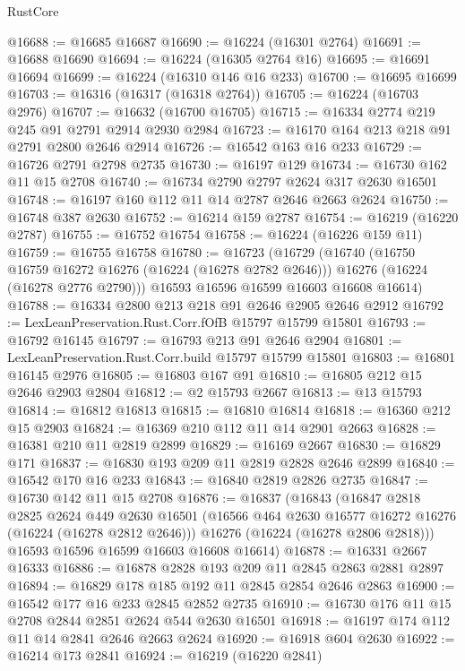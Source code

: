 \begin{lexlean}{RustCore}
\begin{coremodule}
@16688 := @16685 @16687
@16690 := @16224 (@16301 @2764)
@16691 := @16688 @16690
@16694 := @16224 (@16305 @2764 @16)
@16695 := @16691 @16694
@16699 := @16224 (@16310 @146 @16 @233)
@16700 := @16695 @16699
@16703 := @16316 (@16317 (@16318 @2764))
@16705 := @16224 (@16703 @2976)
@16707 := @16632 (@16700 @16705)
@16715 := @16334 @2774 @219 @245 @91 @2791 @2914 @2930 @2984
@16723 := @16170 @164 @213 @218 @91 @2791 @2800 @2646 @2914
@16726 := @16542 @163 @16 @233
@16729 := @16726 @2791 @2798 @2735
@16730 := @16197 @129
@16734 := @16730 @162 @11 @15 @2708
@16740 := @16734 @2790 @2797 @2624 @317 @2630 @16501
@16748 := @16197 @160 @112 @11 @14 @2787 @2646 @2663 @2624
@16750 := @16748 @387 @2630
@16752 := @16214 @159 @2787
@16754 := @16219 (@16220 @2787)
@16755 := @16752 @16754
@16758 := @16224 (@16226 @159 @11)
@16759 := @16755 @16758
@16780 := @16723
    (@16729
      (@16740
        (@16750 @16759 @16272 @16276 (@16224 (@16278 @2782 @2646)))
        @16276
        (@16224 (@16278 @2776 @2790)))
      @16593
      @16596
      @16599
      @16603
      @16608
      @16614)
@16788 := @16334 @2800 @213 @218 @91 @2646 @2905 @2646 @2912
@16792 := LexLeanPreservation.Rust.Corr.fOfB @15797 @15799 @15801
@16793 := @16792 @16145
@16797 := @16793 @213 @91 @2646 @2904
@16801 := LexLeanPreservation.Rust.Corr.build @15797 @15799 @15801
@16803 := @16801 @16145 @2976
@16805 := @16803 @167 @91
@16810 := @16805 @212 @15 @2646 @2903 @2804
@16812 := @2 @15793 @2667
@16813 := @13 @15793
@16814 := @16812 @16813
@16815 := @16810 @16814
@16818 := @16360 @212 @15 @2903
@16824 := @16369 @210 @112 @11 @14 @2901 @2663
@16828 := @16381 @210 @11 @2819 @2899
@16829 := @16169 @2667
@16830 := @16829 @171
@16837 := @16830 @193 @209 @11 @2819 @2828 @2646 @2899
@16840 := @16542 @170 @16 @233
@16843 := @16840 @2819 @2826 @2735
@16847 := @16730 @142 @11 @15 @2708
@16876 := @16837
    (@16843
      (@16847
        @2818
        @2825
        @2624
        @449
        @2630
        @16501
        (@16566 @464 @2630 @16577 @16272 @16276 (@16224 (@16278 @2812 @2646)))
        @16276
        (@16224 (@16278 @2806 @2818)))
      @16593
      @16596
      @16599
      @16603
      @16608
      @16614)
@16878 := @16331 @2667 @16333
@16886 := @16878 @2828 @193 @209 @11 @2845 @2863 @2881 @2897
@16894 := @16829 @178 @185 @192 @11 @2845 @2854 @2646 @2863
@16900 := @16542 @177 @16 @233 @2845 @2852 @2735
@16910 := @16730 @176 @11 @15 @2708 @2844 @2851 @2624 @544 @2630 @16501
@16918 := @16197 @174 @112 @11 @14 @2841 @2646 @2663 @2624
@16920 := @16918 @604 @2630
@16922 := @16214 @173 @2841
@16924 := @16219 (@16220 @2841)

\end{coremodule}
\end{lexlean}
